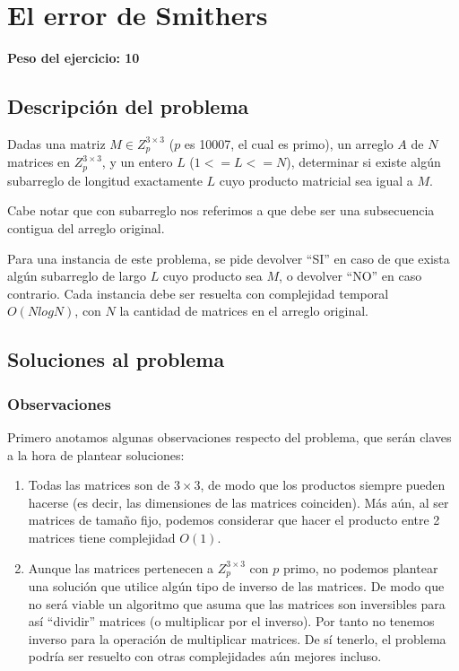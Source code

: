 \newpage{}
\section{El error de Smithers}
\textbf{Peso del ejercicio: 10}
\subsection{Descripción del problema}
Dadas una matriz $M\in Z_p^{3 \times 3}$ ($p$ es 10007, el cual es primo), un arreglo 
$A$ de $N$ matrices en $Z_p^{3 \times 3}$, 
y un entero $L$ ($1 <= L <= N$), determinar si existe algún subarreglo 
de longitud exactamente $L$ cuyo producto matricial 
sea igual a $M$. 

Cabe notar que con subarreglo nos referimos a que debe ser una 
subsecuencia contigua del arreglo original. 

Para una instancia de este problema, se pide devolver ``SI'' en 
caso de que exista algún subarreglo de largo $L$ cuyo producto sea $M$, o devolver 
``NO'' en caso contrario. Cada instancia debe ser resuelta con complejidad temporal 
$O(N log N)$, con $N$ 
la cantidad de matrices en el arreglo original. 

\subsection{Soluciones al problema}
\subsubsection{Observaciones}

Primero anotamos algunas observaciones respecto del problema, que serán claves a la
hora de plantear soluciones: 
\begin{enumerate}
    \item Todas las matrices son de $3 \times 3$, de modo que los productos siempre pueden 
    hacerse (es decir, las dimensiones de las matrices coinciden). Más aún, al ser matrices 
    de tamaño fijo, podemos considerar que hacer el producto entre 2 matrices tiene 
    complejidad $O(1)$. 
    \item Aunque las matrices pertenecen a $Z_p^{3 \times 3}$ con $p$ primo, 
    no podemos plantear una solución que utilice algún tipo de inverso de las matrices. 
    De modo que no será viable un algoritmo que asuma que las matrices son inversibles para 
    así ``dividir'' matrices (o multiplicar por el inverso). Por tanto no tenemos inverso para la 
    operación de multiplicar matrices. De sí tenerlo, el problema podría ser resuelto con 
    otras complejidades aún mejores incluso. 
\end{enumerate}

